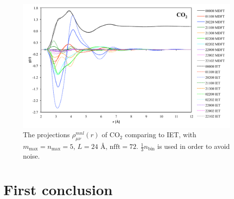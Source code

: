 \begin{figure}[h]
\begin{centering}
\includegraphics[width=1\columnwidth]{_figure/results/co2}
\par\end{centering}
\caption[The projections $\rho_{\mu\nu}^{mnl}(r)$ of $\mathrm{CO}_{2}$ comparing
to \acs{IET}]{The projections $\rho_{\mu\nu}^{mnl}(r)$ of $\mathrm{CO}_{2}$ comparing
to \acs{IET}, with $m_{\max}=n_{\max}=5$, $L=24$ $\textrm{Å}$,
$\mathrm{nfft}=72$. $\frac{1}{3}n_{\mathrm{bin}}$ is used in order
to avoid noise.\label{fig:Comparison-co2}}
\end{figure}


\section{First conclusion}


